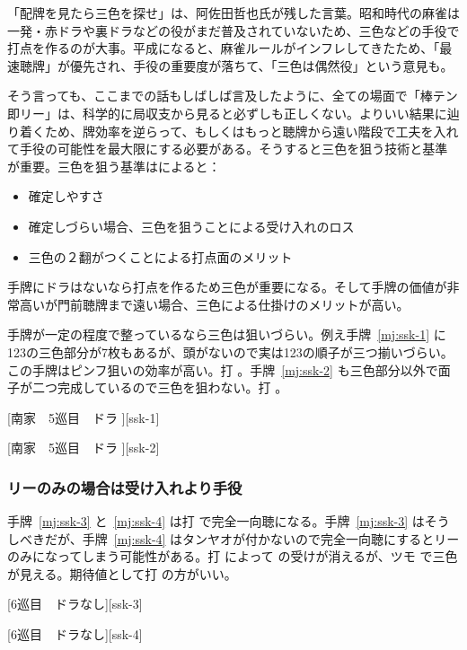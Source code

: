 \documentclass[../nankiru_main.tex]{subfiles}
\begin{document}
「配牌を見たら三色を探せ」は、阿佐田哲也氏が残した言葉。昭和時代の麻雀は一発・赤ドラや裏ドラなどの役がまだ普及されていないため、三色などの手役で打点を作るのが大事。平成になると、麻雀ルールがインフレしてきたため、「最速聴牌」が優先され、手役の重要度が落ちて、「三色は偶然役」という意見も。

そう言っても、ここまでの話もしばしば言及したように、全ての場面で「棒テン即リー」は、科学的に局収支から見ると必ずしも正しくない。よりいい結果に辿り着くため、牌効率を逆らって、もしくはもっと聴牌から遠い階段で工夫を入れて手役の可能性を最大限にする必要がある。そうすると三色を狙う技術と基準が重要。三色を狙う基準は\citet{gendai-ssk}によると：

\begin{itemize}
\item 確定しやすさ
\item 確定しづらい場合、三色を狙うことによる受け入れのロス
\item 三色の２翻がつくことによる打点面のメリット
\end{itemize}

手牌にドラはないなら打点を作るため三色が重要になる。そして手牌の価値が非常高いが門前聴牌まで遠い場合、三色による仕掛けのメリットが高い。

手牌が一定の程度で整っているなら三色は狙いづらい。例え手牌~\ref{mj:ssk-1} に123の三色部分が7枚もあるが、頭がないので実は123の順子が三つ揃いづらい。この手牌はピンフ狙いの効率が高い。打 。手牌~\ref{mj:ssk-2} も三色部分以外で面子が二つ完成しているので三色を狙わない。打  \citep[][p.~67]{zero-teyaku}。

[南家　5巡目　ドラ ][ssk-1]

[南家　5巡目　ドラ ][ssk-2]


\subsubsection*{リーのみの場合は受け入れより手役}

手牌~\ref{mj:ssk-3} と~\ref{mj:ssk-4} は打  で完全一向聴になる。手牌~\ref{mj:ssk-3} はそうしべきだが、手牌~\ref{mj:ssk-4} はタンヤオが付かないので完全一向聴にするとリーのみになってしまう可能性がある。打  によって  の受けが消えるが、ツモ  で三色が見える。期待値として打  の方がいい\citep{clearrain-ssk}。

[6巡目　ドラなし][ssk-3]

[6巡目　ドラなし][ssk-4]
\end{document}
